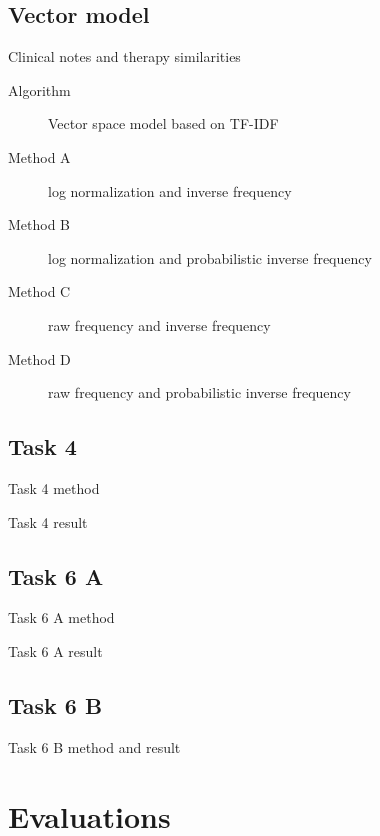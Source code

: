 \documentclass[screen, compress]{beamer}
\begin{document}
\subsection{Vector model}
\begin{frame}{Clinical notes and therapy similarities}
\begin{description}
	\item[Algorithm] Vector space model based on TF-IDF
	\item[Method A] log normalization and inverse frequency
	\item[Method B] log normalization and probabilistic inverse frequency
	\item[Method C] raw frequency and inverse frequency
	\item[Method D] raw frequency and probabilistic inverse frequency
\end{description}
\end{frame}

\subsection{Task 4}
\begin{frame}{Task 4 method}
\end{frame}

\begin{frame}{Task 4 result}
\end{frame}

\subsection{Task 6 A}
\begin{frame}{Task 6 A method}
\end{frame}

\begin{frame}{Task 6 A result}
\end{frame}

\subsection{Task 6 B}
\begin{frame}{Task 6 B method and result}
\end{frame}


\section{Evaluations}
\end{document}
